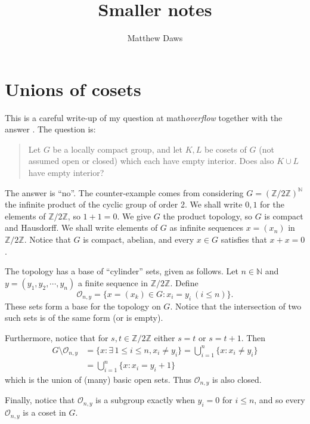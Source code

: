\documentclass[twoside,a4paper,12pt]{article}
\theoremstyle{plain}
\theoremstyle{definition}
\begin{document}
\title{Smaller notes}
\author{Matthew Daws}
\maketitle

\tableofcontents



\section{Unions of cosets}

This is a careful write-up of my question \cite{q1} at math\emph{overflow} together with the
answer \cite{a1}.  The question is:

\begin{quote}
Let $G$ be a locally compact group, and let $K,L$ be cosets of $G$ (not assumed open or closed)
which each have empty interior.  Does also $K\cup L$ have empty interior?
\end{quote}

The answer is ``no''.  The counter-example comes from considering $G = (\mathbb Z/2\mathbb Z
)^{\mathbb N}$ the infinite product of the cyclic group of order 2.  We shall write $0,1$ for the
elements of $\mathbb Z/2\mathbb Z$, so $1+1=0$.  We give $G$ the product topology, so $G$ is compact
and Hausdorff.  We shall write elements of $G$ as infinite sequences $x = (x_n)$ in
$\mathbb Z/2\mathbb Z$.  Notice that $G$ is compact, abelian, and every $x\in G$ satisfies
that $x+x=0$.

The topology has a base of ``cylinder'' sets, given as follows.  Let $n\in\mathbb N$ and $y=(y_1,
y_2,\cdots,y_n)$ a finite sequence in $\mathbb Z/2\mathbb Z$.  Define
\[ \mathcal O_{n,y} = \big\{ x=(x_k)\in G : x_i = y_i \ (i\leq n) \big\}. \]
These sets form a base for the topology on $G$.  Notice that the intersection of two such sets
is of the same form (or is empty).

Furthermore, notice that for $s,t\in\mathbb Z/2\mathbb Z$ either $s=t$ or $s=t+1$.  Then
\begin{align*} G \setminus \mathcal O_{n,y}
&= \big\{ x : \exists\, 1\leq i\leq n, x_i\not=y_i \big\}
= \bigcup_{i=1}^n \big\{ x : x_i\not=y_i \big\} \\
&= \bigcup_{i=1}^n \big\{ x : x_i=y_i+1 \big\}
\end{align*}
which is the union of (many) basic open sets.  Thus $\mathcal O_{n,y}$ is also closed.

Finally, notice that $\mathcal O_{n,y}$ is a subgroup exactly when $y_i=0$ for $i\leq n$, and so
every $\mathcal O_{n,y}$ is a coset in $G$.
\end{document}
